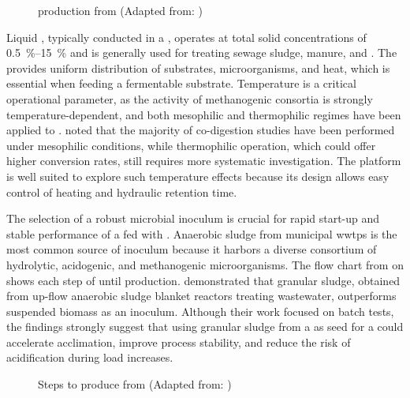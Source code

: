 \begin{figure}[H]
    \centering
    \resizebox{0.65\textwidth}{!}{%
        
    }
    \caption{ production from  (Adapted from: \textcite{li2011})}
    \label{graph:ch4-prod}
\end{figure}

Liquid , typically conducted in a , operates at total solid concentrations of \qtyrange{0.5}{15}{\percent} and is generally used for treating sewage sludge, manure, and  \parencite{li2011}. The  provides uniform distribution of substrates, microorganisms, and heat, which is essential when feeding a fermentable substrate. Temperature is a critical operational parameter, as the activity of methanogenic consortia is strongly temperature-dependent, and both mesophilic and thermophilic regimes have been applied to  \parencite{choorit2007}. \textcite{tomczak2025} noted that the majority of  co-digestion studies have been performed under mesophilic conditions, while thermophilic operation, which could offer higher conversion rates, still requires more systematic investigation. The  platform is well suited to explore such temperature effects because its design allows easy control of heating and hydraulic retention time.

The selection of a robust microbial inoculum is crucial for rapid start-up and stable performance of a  fed with . Anaerobic sludge from municipal \glspl{wwtp} is the most common source of inoculum because it harbors a diverse consortium of hydrolytic, acidogenic, and methanogenic microorganisms. The flow chart from \textcite{gebreegziabher2025} on  shows each step of  until  production. \textcite{posmanik2020} demonstrated that granular sludge, obtained from up-flow anaerobic sludge blanket reactors treating wastewater, outperforms suspended biomass as an inoculum. Although their work focused on batch tests, the findings strongly suggest that using granular sludge from a  as seed for a  could accelerate acclimation, improve process stability, and reduce the risk of acidification during load increases.

\begin{figure}[H]
    \centering
    \resizebox{0.65\textwidth}{!}{%
        
    }
    \caption{Steps to produce  from  (Adapted from: \textcite{gebreegziabher2025})}
    \label{graph:ch4-steps}
\end{figure}

